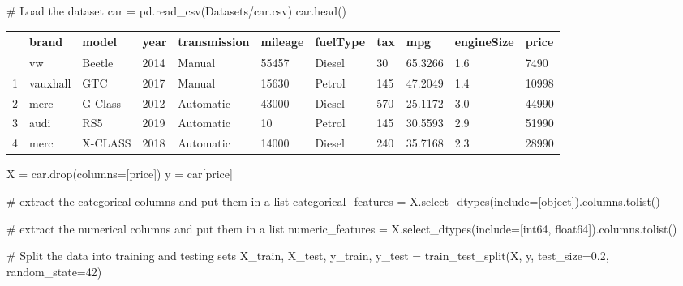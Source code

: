 \documentclass[
  letterpaper,
  DIV=11,
  numbers=noendperiod]{scrreprt}
\newenvironment{Shaded}{\begin{snugshade}}{\end{snugshade}}
\newcommand{\CommentTok}[1]{\textcolor[rgb]{0.37,0.37,0.37}{#1}}
\newcommand{\DecValTok}[1]{\textcolor[rgb]{0.68,0.00,0.00}{#1}}
\newcommand{\FloatTok}[1]{\textcolor[rgb]{0.68,0.00,0.00}{#1}}
\newcommand{\NormalTok}[1]{\textcolor[rgb]{0.00,0.23,0.31}{#1}}
\newcommand{\OperatorTok}[1]{\textcolor[rgb]{0.37,0.37,0.37}{#1}}
\newcommand{\StringTok}[1]{\textcolor[rgb]{0.13,0.47,0.30}{#1}}
\begin{document}
\begin{Shaded}
\begin{Highlighting}[]
\CommentTok{\# Load the dataset}
\NormalTok{car }\OperatorTok{=}\NormalTok{ pd.read\_csv(}\StringTok{\textquotesingle{}Datasets/car.csv\textquotesingle{}}\NormalTok{)}
\NormalTok{car.head()}
\end{Highlighting}
\end{Shaded}

\begin{longtable}[]{@{}lllllllllll@{}}
\toprule\noalign{}
& brand & model & year & transmission & mileage & fuelType & tax & mpg &
engineSize & price \\
\midrule\noalign{}
\endhead
\bottomrule\noalign{}
\endlastfoot
0 & vw & Beetle & 2014 & Manual & 55457 & Diesel & 30 & 65.3266 & 1.6 &
7490 \\
1 & vauxhall & GTC & 2017 & Manual & 15630 & Petrol & 145 & 47.2049 &
1.4 & 10998 \\
2 & merc & G Class & 2012 & Automatic & 43000 & Diesel & 570 & 25.1172 &
3.0 & 44990 \\
3 & audi & RS5 & 2019 & Automatic & 10 & Petrol & 145 & 30.5593 & 2.9 &
51990 \\
4 & merc & X-CLASS & 2018 & Automatic & 14000 & Diesel & 240 & 35.7168 &
2.3 & 28990 \\
\end{longtable}

\begin{Shaded}
\begin{Highlighting}[]
\NormalTok{X }\OperatorTok{=}\NormalTok{ car.drop(columns}\OperatorTok{=}\NormalTok{[}\StringTok{\textquotesingle{}price\textquotesingle{}}\NormalTok{])}
\NormalTok{y }\OperatorTok{=}\NormalTok{ car[}\StringTok{\textquotesingle{}price\textquotesingle{}}\NormalTok{]}

\CommentTok{\# extract the categorical columns and put them in a list}
\NormalTok{categorical\_features }\OperatorTok{=}\NormalTok{ X.select\_dtypes(include}\OperatorTok{=}\NormalTok{[}\StringTok{\textquotesingle{}object\textquotesingle{}}\NormalTok{]).columns.tolist()}

\CommentTok{\# extract the numerical columns and put them in a list}
\NormalTok{numeric\_features }\OperatorTok{=}\NormalTok{ X.select\_dtypes(include}\OperatorTok{=}\NormalTok{[}\StringTok{\textquotesingle{}int64\textquotesingle{}}\NormalTok{, }\StringTok{\textquotesingle{}float64\textquotesingle{}}\NormalTok{]).columns.tolist()}

\CommentTok{\# Split the data into training and testing sets}
\NormalTok{X\_train, X\_test, y\_train, y\_test }\OperatorTok{=}\NormalTok{ train\_test\_split(X, y, test\_size}\OperatorTok{=}\FloatTok{0.2}\NormalTok{, random\_state}\OperatorTok{=}\DecValTok{42}\NormalTok{)}
\end{Highlighting}
\end{Shaded}
\end{document}
